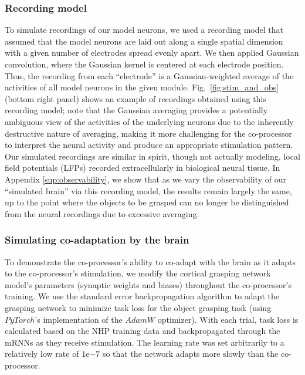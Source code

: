 \documentclass[12pt]{iopart}
\begin{document}
\subsubsection{Recording model}
To simulate recordings of our model neurons, we used a recording model that assumed that the model neurons
are laid out along a single spatial dimension with a given number of electrodes spread evenly apart.
We then applied Gaussian convolution, where the Gaussian kernel is centered at each electrode position.
Thus, the recording from each ``electrode'' is a Gaussian-weighted average of the activities of all model neurons
in the given module. Fig.~\ref{fig:stim_and_obs} (bottom right panel) shows an example of recordings obtained
using this recording model; note that the Gaussian averaging provides a potentially ambiguous view of the
activities of the underlying neurons due to the inherently destructive nature of averaging, making it
more challenging for the co-processor to interpret the neural activity and produce an appropriate
stimulation pattern. Our simulated recordings are similar in spirit, though not actually modeling,
local field potentials (LFPs) recorded extracellularly in biological neural tissue. In Appendix
\ref{sup:observability}, we show that as we vary the observability of our ``simulated brain'' via this recording
model, the results remain largely the same, up to the point where the objects to be grasped can no longer be
distinguished from the neural recordings due to excessive averaging. 

\subsubsection{Simulating co-adaptation by the brain}
To demonstrate the co-processor's ability to co-adapt with the brain as it adapts to the co-processor's
stimulation, we modify the cortical grasping network model's parameters (synaptic weights and biases) throughout
the co-processor's training. We use the standard error backpropagation algorithm to adapt the grasping network to
minimize task loss for the object grasping task (using $PyTorch$'s implementation of the $AdamW$ optimizer). With each
trial, task loss is calculated based on the NHP training data and backpropagated through the mRNNs as they receive
stimulation. The learning rate was set arbitrarily to a relatively low rate of $1\mathrm{e}{-7}$ so that the network
adapts more slowly than the co-processor.
\end{document}
